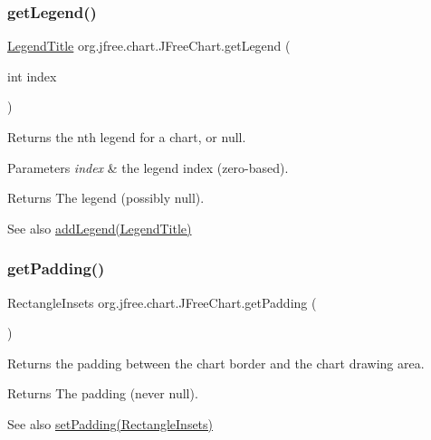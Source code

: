 \subsubsection{\texorpdfstring{get\+Legend()}{getLegend()}\hspace{0.1cm}{\footnotesize\ttfamily [2/2]}}
{\footnotesize\ttfamily \mbox{\hyperlink{classorg_1_1jfree_1_1chart_1_1title_1_1_legend_title}{Legend\+Title}} org.\+jfree.\+chart.\+J\+Free\+Chart.\+get\+Legend (\begin{DoxyParamCaption}\item[{int}]{index }\end{DoxyParamCaption})}

Returns the nth legend for a chart, or {\ttfamily null}.


\begin{DoxyParams}{Parameters}
{\em index} & the legend index (zero-\/based).\\
\hline
\end{DoxyParams}
\begin{DoxyReturn}{Returns}
The legend (possibly {\ttfamily null}).
\end{DoxyReturn}
\begin{DoxySeeAlso}{See also}
\mbox{\hyperlink{classorg_1_1jfree_1_1chart_1_1_j_free_chart_ae44c0da2bbdccd9921a15df955f7c20b}{add\+Legend(\+Legend\+Title)}} 
\end{DoxySeeAlso}
\mbox{\label{classorg_1_1jfree_1_1chart_1_1_j_free_chart_a56dff2dce4f2eb661215aad988887d8f}} 
\subsubsection{\texorpdfstring{get\+Padding()}{getPadding()}}
{\footnotesize\ttfamily Rectangle\+Insets org.\+jfree.\+chart.\+J\+Free\+Chart.\+get\+Padding (\begin{DoxyParamCaption}{ }\end{DoxyParamCaption})}

Returns the padding between the chart border and the chart drawing area.

\begin{DoxyReturn}{Returns}
The padding (never {\ttfamily null}).
\end{DoxyReturn}
\begin{DoxySeeAlso}{See also}
\mbox{\hyperlink{classorg_1_1jfree_1_1chart_1_1_j_free_chart_a978fccb7d5dc20a6754a9045f61d5b11}{set\+Padding(\+Rectangle\+Insets)}} 
\end{DoxySeeAlso}
\mbox{\label{classorg_1_1jfree_1_1chart_1_1_j_free_chart_aac70289d4ca81df3434b476f54286ee7}} 
